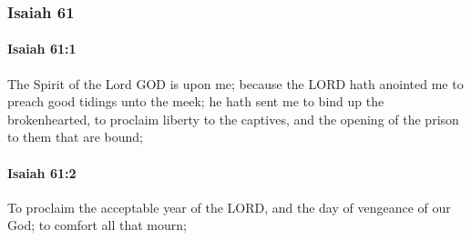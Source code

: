 	\subsubsection{Isaiah 61} %
		\label{ISAIAH-61}

		\paragraph{Isaiah 61:1} %
			\label{ISAIAH-61-1}

			The Spirit of the Lord GOD is upon me; because the LORD hath anointed me to preach good tidings unto the meek; he hath sent me to bind up the brokenhearted, to proclaim liberty to the captives, and the opening of the prison to them that are bound;


		\paragraph{Isaiah 61:2} %
			\label{ISAIAH-61-2}

			To proclaim the acceptable year of the LORD, and the day of vengeance of our God; to comfort all that mourn;

